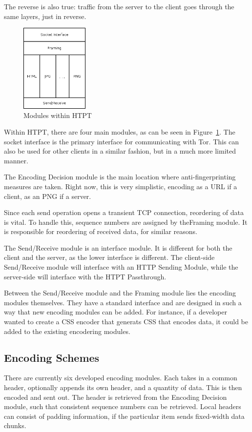 The reverse is also true: traffic from the server to the client goes through the same layers, just in reverse. 

\begin{figure}[b]
\centering
\includegraphics[width=0.3\textwidth]{htpt_architecture}
\caption{Modules within HTPT}
\label{fig:htpt_modules}
\end{figure}

Within HTPT, there are four main modules, as can be seen in Figure~\ref{fig:htpt_modules}. The socket interface is the primary interface for communicating with Tor. This can also be used for other clients in a similar fashion, but in a much more limited manner.

The Encoding Decision module is the main location where anti-fingerprinting measures are taken. Right now, this is very simplistic, encoding as a URL if a client, as an PNG if a server. 

Since each send operation opens a transient TCP connection, reordering of data is vital. To handle this, sequence numbers are assigned by theFraming module. It is responsible for reordering of received data, for similar reasons. 

The Send/Receive module is an interface module. It is different for both the client and the server, as the lower interface is different. The client-side Send/Receive module will interface with an HTTP Sending Module, while the server-side will interface with the HTPT Passthrough.

Between the Send/Receive module and the Framing module lies the encoding modules themselves. They have a standard interface and are designed in such a way that new encoding modules can be added. For instance, if a developer wanted to create a CSS encoder that generats CSS that encodes data, it could be added to the existing encodering modules.

\subsection{Encoding Schemes}
There are currently six developed encoding modules. Each takes in a common header, optionally appends its own header, and a quantity of data. This is then encoded and sent out. The header is retrieved from the Encoding Decision module, such that consistent sequence numbers can be retrieved. Local headers can consist of padding information, if the particular item sends fixed-width data chunks. 

